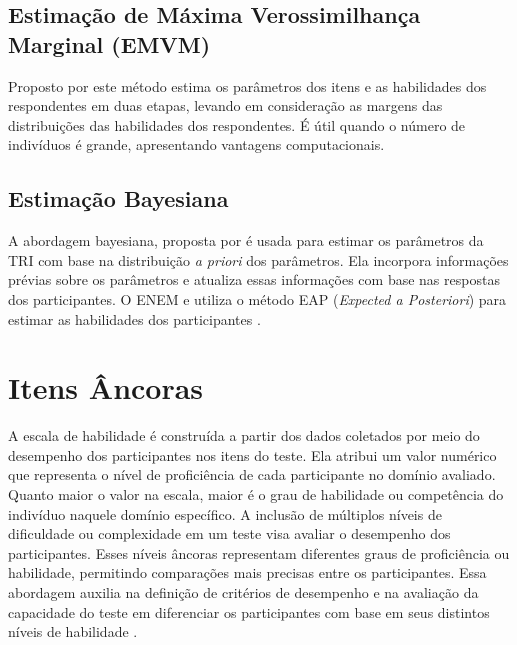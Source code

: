 \begin{comment}
Além do método de Estimação de Máxima Verossimilhança (EMV), existem outros métodos de estimação dos parâmetros, que são frequentemente utilizados em contextos de avaliação educacional, estes incluem:
\end{comment}

\subsection{Estimação de Máxima Verossimilhança Marginal (EMVM)}

 Proposto por  este método estima os parâmetros dos itens e as habilidades dos respondentes em duas etapas, levando em consideração as margens das distribuições das habilidades dos respondentes. É útil quando o número de indivíduos é grande, apresentando vantagens computacionais.
 
\subsection{Estimação Bayesiana}


A abordagem bayesiana, proposta por  é usada para estimar os parâmetros da TRI com base na distribuição \textit{a priori} dos parâmetros. Ela incorpora informações prévias sobre os parâmetros e atualiza essas informações com base nas respostas dos participantes. O ENEM e utiliza o método EAP (\textit{Expected a Posteriori}) para estimar as habilidades dos participantes \cite{inep2021}.



 
 

\section{Itens Âncoras}

A escala de habilidade é construída a partir dos dados coletados por meio do desempenho dos participantes nos itens do teste. Ela atribui um valor numérico que representa o nível de proficiência de cada participante no domínio avaliado. Quanto maior o valor na escala, maior é o grau de habilidade ou competência do indivíduo naquele domínio específico. A inclusão de múltiplos níveis de dificuldade ou complexidade em um teste visa avaliar o desempenho dos participantes. Esses níveis âncoras representam diferentes graus de proficiência ou habilidade, permitindo comparações mais precisas entre os participantes. Essa abordagem auxilia na definição de critérios de desempenho e na avaliação da capacidade do teste em diferenciar os participantes com base em seus distintos níveis de habilidade \cite{valle2001}.

